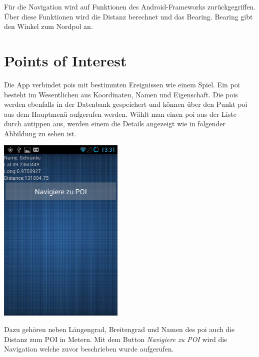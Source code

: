 Für die Navigation wird auf Funktionen des Android-Frameworks zurückgegriffen. Über diese Funktionen wird die Distanz berechnet und das Bearing. Bearing gibt den Winkel zum Nordpol an.

\section{Points of Interest}
Die App verbindet \glspl{poi} mit bestimmten Ereignissen wie einem Spiel. Ein \gls{poi} besteht im Wesentlichen aus Koordinaten, Namen und Eigenschaft.  Die \glspl{poi} werden ebenfalls in der Datenbank gespeichert und können über den Punkt \gls{poi} aus dem Hauptmenü aufgerufen werden. Wählt man einen \gls{poi} aus der Liste durch antippen aus, werden einem die Details angezeigt wie in folgender Abbildung zu sehen ist.
\begin{capfigure}
	\includegraphics[width=6cm]{images/app/poidetail}
\end{capfigure}
Dazu gehören neben Längengrad, Breitengrad und Namen des \gls{poi} auch die Distanz zum POI in Metern. Mit dem Button \textit{Navigiere zu POI} wird die Navigation welche zuvor beschrieben wurde aufgerufen.
\clearpage

